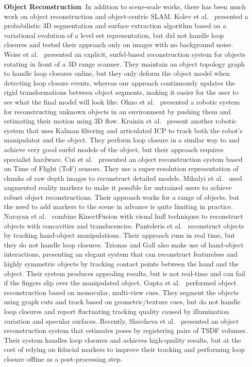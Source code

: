 \textbf{Object Reconstruction}. In addition to scene-scale works, there has been much work on object reconstruction and object-centric SLAM. Kolev et al.\ \cite{Kolev2006} presented a probabilistic 3D segmentation and surface extraction algorithm based on a variational evolution of a level set representation, but did not handle loop closures and tested their approach only on images with no background noise. Weise et al.\ \cite{Weise2009} presented an explicit, surfel-based reconstruction system for objects rotating in front of a 3D range scanner. They maintain an object topology graph to handle loop closures online, but they only deform the object model when detecting loop closure events, whereas our approach continuously updates the rigid transformations between object segments, making it easier for the user to see what the final model will look like. Ohno et al.\ \cite{Ohno2011} presented a robotic system for reconstructing unknown objects in an environment by pushing them and estimating their motion using 3D flow. Krainin et al.\ \cite{Krainin2011IJRR} present another robotic system that uses Kalman filtering and articulated ICP to track both the robot's manipulator and the object. They perform loop closure in a similar way to \cite{Weise2009} and achieve very good surfel models of the object, but their approach requires specialist hardware. Cui et al.\ \cite{Cui2013} presented an object reconstruction system based on Time of Flight (ToF) sensors. They use a super-resolution representation of chunks of raw depth images to reconstruct detailed models. Mihalyi et al.\ \cite{Mihalyi2015} used augmented reality markers to make it possible for untrained users to achieve robust object reconstructions. Their approach works for a range of objects, but the need to add markers to the scene in advance is quite limiting in practice. Narayan et al.\ \cite{Narayan2015} combine KinectFusion with visual hull techniques to reconstruct objects with concavities and translucencies. Panteleris et al.\ \cite{Pantaleris2015, Panteleris2015b} reconstruct objects by tracking hand-object manipulations. Their approach runs in real time, but they do not handle loop closures. Tzionas and Gall \cite{Tzionas2015} also make use of hand-object interactions, presenting an elegant system that can reconstruct featureless and highly symmetric objects by tracking contact points between the hand and the object. Their system produces appealing results, but is not real-time and can fail if the fingers slip over the manipulated object. Gupta et al.\ \cite{Gupta2016} performed object reconstruction based on monocular, multi-view cues. They segment the objects using graph cuts and track based on geometric/texture cues, but do not handle loop closures and report fluctuating tracking quality caused by illumination variation and specular surfaces. Recently, Slavcheva et al.\ \cite{slavcheva2016eccv} presented an object reconstruction system that estimates poses by registering pairs of TSDF volumes. Their system handles loop closures and achieves high-quality results, but at the cost of relying on fiducial markers to improve their tracking and performing loop closure offline as a post-processing step.

